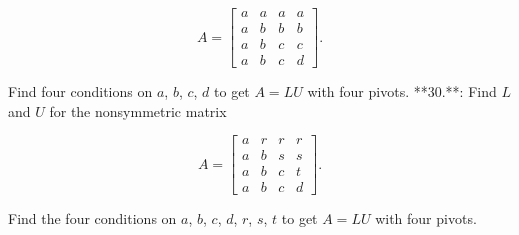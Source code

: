 \[A=\begin{bmatrix}a&a&a&a\\ a&b&b&b\\ a&b&c&c\\ a&b&c&d\end{bmatrix}.\]

Find four conditions on \(a\), \(b\), \(c\), \(d\) to get \(A=LU\) with four pivots.
**30.**: Find \(L\) and \(U\) for the nonsymmetric matrix

\[A=\begin{bmatrix}a&r&r&r\\ a&b&s&s\\ a&b&c&t\\ a&b&c&d\end{bmatrix}.\]

Find the four conditions on \(a\), \(b\), \(c\), \(d\), \(r\), \(s\), \(t\) to get \(A=LU\) with four pivots.

